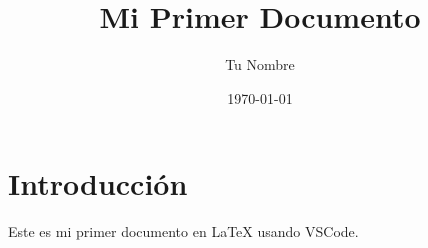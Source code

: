\documentclass{article}
\title{Mi Primer Documento}
\author{Tu Nombre}
\date{\today}
\begin{document}
\maketitle

\section{Introducción}
Este es mi primer documento en \LaTeX{} usando VSCode.
\end{document}
